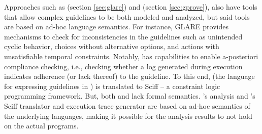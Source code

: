 Approaches such as \GLARE{} (section \ref{sec:glare}) and \GPROVE (section
\ref{sec:gprove}), also have tools that allow complex guidelines to
be both modeled and analyzed, but said tools are based on ad-hoc language
semantics. For instance, GLARE{} provides mechanisms to check
for inconsistencies in the guidelines such as unintended cyclic
behavior, choices without alternative options, and actions
with unsatisfiable temporal constraints. Notably, \GPROVE{}
has capabilities to enable a-posteriori compliance checking, i.e., checking whether a log
generated during execution indicates adherence (or lack thereof) to the guideline.
To this end, \GOSPEL{} (the language for expressing guidelines in \GPROVE{})
is translated to Sciff -- a constraint logic programming framework.
But, both \GLARE{} and \GPROVE{} lack formal semantics. \GLARE{}'s analysis
and \GPROVE{}'s Sciff translator and execution trace generator are based on
ad-hoc semantics of the underlying languages, making it possible for the
analysis results to not hold on the actual programs.










